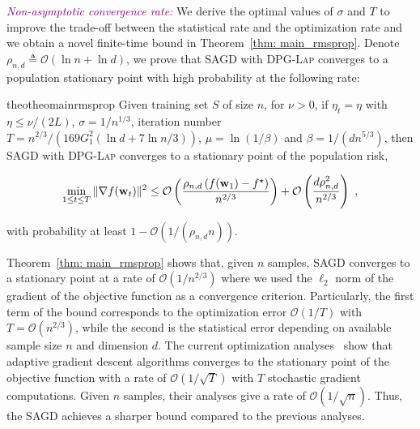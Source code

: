 \documentclass[11pt]{article}
\begin{document}
\textcolor{purple}{\textit{Non-asymptotic convergence rate:}}
We derive the optimal values of $\sigma$ and $T$ to improve the trade-off between the statistical rate and the optimization rate and we obtain a novel finite-time bound in Theorem~\ref{thm: main_rmsprop}. 
Denote $\rho_{n,d} \triangleq\mathcal{O} \left(\ln n + \ln d\right)$, we prove that \textsc{SAGD} with \textsc{DPG-Lap} converges to a population stationary point with high probability at the following rate:

\begin{restatable}{theo}{theomainrmsprop}
\label{thm: main_rmsprop}
 Given training set $S$ of size $n$, for $\nu >0$, if $\eta_t = \eta$  with $\eta \leq \nu/(2L)$,  $\sigma = 1/n^{1/3}$, iteration number $T = n^{2/3}/\left(169G_1^2(\ln d +7\ln n/3)\right)$, $\mu = \ln (1/\beta)$ and $\beta = 1/(d n^{5/3})$, then \textsc{SAGD} with \textsc{DPG-Lap} converges to a stationary point of the population risk, \ie 
 \begin{small}
\begin{equation*}
 \min_{1\leq t \leq T}\|\nabla f(\mathbf{w}_t)\|^2 \leq
\mathcal{O} \left( \frac{\rho_{n,d} \left(f(\mathbf{w}_1) - f^\star \right)}{n^{2/3}} \right) + \mathcal{O} \left( \frac{d \rho_{n,d}^2}{n^{2/3}}\right)~,
\end{equation*}
\end{small}
with probability at least $1-\mathcal{O} \left(1/(\rho_{n,d} n)\right)$.
\end{restatable} 
Theorem~\ref{thm: main_rmsprop} shows that, given $n$ samples, \textsc{SAGD} converges to a stationary point at a rate of $\mathcal{O}(1/n^{2/3})$ where we used the $\ell_2$ norm of the gradient of the objective function as a convergence criterion.
Particularly, the first term of the bound corresponds to the optimization error $\mathcal{O}(1/T)$ with $T = \mathcal{O}(n^{2/3})$, while the second is the statistical error depending on available sample size $n$ and dimension $d$. 
The current optimization analyses~\citep{zare18, wawu19, zosh2019, cheli2019} show that adaptive gradient descent algorithms converges to the stationary point of the objective function with a rate of $\mathcal{O}(1/\sqrt{T})$ with $T$ stochastic gradient computations. 
Given $n$ samples, their analyses give a rate of  $\mathcal{O}(1/\sqrt{n})$. 
Thus, the \textsc{SAGD} achieves a sharper bound compared to the previous analyses.  
\end{document}
